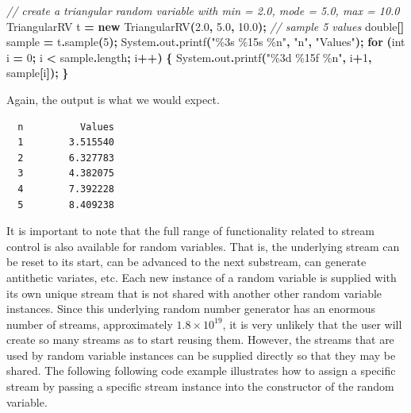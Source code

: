 \documentclass[
]{book}
\newenvironment{Shaded}{\begin{snugshade}}{\end{snugshade}}
\newcommand{\BuiltInTok}[1]{#1}
\newcommand{\CommentTok}[1]{\textcolor[rgb]{0.56,0.35,0.01}{\textit{#1}}}
\newcommand{\ControlFlowTok}[1]{\textcolor[rgb]{0.13,0.29,0.53}{\textbf{#1}}}
\newcommand{\DataTypeTok}[1]{\textcolor[rgb]{0.13,0.29,0.53}{#1}}
\newcommand{\DecValTok}[1]{\textcolor[rgb]{0.00,0.00,0.81}{#1}}
\newcommand{\FloatTok}[1]{\textcolor[rgb]{0.00,0.00,0.81}{#1}}
\newcommand{\FunctionTok}[1]{\textcolor[rgb]{0.00,0.00,0.00}{#1}}
\newcommand{\KeywordTok}[1]{\textcolor[rgb]{0.13,0.29,0.53}{\textbf{#1}}}
\newcommand{\NormalTok}[1]{#1}
\newcommand{\OperatorTok}[1]{\textcolor[rgb]{0.81,0.36,0.00}{\textbf{#1}}}
\newcommand{\SpecialCharTok}[1]{\textcolor[rgb]{0.00,0.00,0.00}{#1}}
\newcommand{\StringTok}[1]{\textcolor[rgb]{0.31,0.60,0.02}{#1}}
\theoremstyle{definition}
\theoremstyle{definition}
\theoremstyle{definition}
\theoremstyle{definition}
\theoremstyle{remark}
\begin{document}
\begin{Shaded}
\begin{Highlighting}[]
\CommentTok{// create a triangular random variable with min = 2.0, mode = 5.0, max = 10.0}
\NormalTok{TriangularRV t }\OperatorTok{=} \KeywordTok{new} \FunctionTok{TriangularRV}\OperatorTok{(}\FloatTok{2.0}\OperatorTok{,} \FloatTok{5.0}\OperatorTok{,} \FloatTok{10.0}\OperatorTok{);}
\CommentTok{// sample 5 values}
\DataTypeTok{double}\OperatorTok{[]}\NormalTok{ sample }\OperatorTok{=}\NormalTok{ t}\OperatorTok{.}\FunctionTok{sample}\OperatorTok{(}\DecValTok{5}\OperatorTok{);}
\BuiltInTok{System}\OperatorTok{.}\FunctionTok{out}\OperatorTok{.}\FunctionTok{printf}\OperatorTok{(}\StringTok{"}\SpecialCharTok{\%3s}\StringTok{ }\SpecialCharTok{\%15s}\StringTok{ }\SpecialCharTok{\%n}\StringTok{"}\OperatorTok{,} \StringTok{"n"}\OperatorTok{,} \StringTok{"Values"}\OperatorTok{);}
\ControlFlowTok{for} \OperatorTok{(}\DataTypeTok{int}\NormalTok{ i }\OperatorTok{=} \DecValTok{0}\OperatorTok{;}\NormalTok{ i }\OperatorTok{\textless{}}\NormalTok{ sample}\OperatorTok{.}\FunctionTok{length}\OperatorTok{;}\NormalTok{ i}\OperatorTok{++)} \OperatorTok{\{}
    \BuiltInTok{System}\OperatorTok{.}\FunctionTok{out}\OperatorTok{.}\FunctionTok{printf}\OperatorTok{(}\StringTok{"}\SpecialCharTok{\%3d}\StringTok{ }\SpecialCharTok{\%15f}\StringTok{ }\SpecialCharTok{\%n}\StringTok{"}\OperatorTok{,}\NormalTok{ i}\OperatorTok{+}\DecValTok{1}\OperatorTok{,}\NormalTok{ sample}\OperatorTok{[}\NormalTok{i}\OperatorTok{]);}
\OperatorTok{\}}
\end{Highlighting}
\end{Shaded}

Again, the output is what we would expect.

\begin{verbatim}
  n          Values 
  1        3.515540 
  2        6.327783 
  3        4.382075 
  4        7.392228 
  5        8.409238 
\end{verbatim}

It is important to note that the full range of functionality related to stream control is also available for random variables. That is, the underlying stream can be reset to its start, can be advanced to the next substream, can generate antithetic variates, etc. Each new instance of a random variable is supplied with its own unique stream that is not shared with another other random variable instances. Since this underlying random number generator has an enormous number of streams, approximately \(1.8 \times 10^{19}\), it is very unlikely that the user will create so many streams as to start reusing them. However, the streams that are used by random variable instances can be supplied directly so that they may be shared. The following following code example illustrates how to assign a specific stream by passing a specific stream instance into the constructor of the random variable.
\end{document}

